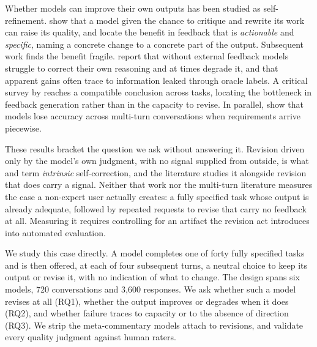 Whether models can improve their own outputs has been studied as self-refinement.
\citet{madaan2024self} show that a model given the chance to critique and rewrite its work
can raise its quality, and locate the benefit in feedback that is \emph{actionable} and
\emph{specific}, naming a concrete change to a concrete part of the output. Subsequent work
finds the benefit fragile. \citet{huang2024large} report that without external feedback
models struggle to correct their own reasoning and at times degrade it, and that apparent
gains often trace to information leaked through oracle labels. A critical survey by
\citet{kamoi2024selfcorrection} reaches a compatible conclusion across tasks, locating the
bottleneck in feedback generation rather than in the capacity to revise. In parallel,
\citet{laban2025lost} show that models lose accuracy across multi-turn conversations when
requirements arrive piecewise.

These results bracket the question we ask without answering it. Revision driven only by the
model's own judgment, with no signal supplied from outside, is what
\citet{kamoi2024selfcorrection} and \citet{huang2024large} term \emph{intrinsic}
self-correction, and the literature studies it alongside revision that does carry a signal.
Neither that work nor the multi-turn literature measures the case a non-expert user
actually creates: a fully specified task whose output is already adequate, followed by
repeated requests to revise that carry no feedback at all. Measuring it requires
controlling for an artifact the revision act introduces into automated evaluation.

We study this case directly. A model completes one of forty fully specified tasks and is
then offered, at each of four subsequent turns, a neutral choice to keep its output or
revise it, with no indication of what to change. The design spans six models, 720
conversations and 3,600 responses. We ask whether such a model revises at all (RQ1),
whether the output improves or degrades when it does (RQ2), and whether failure traces to
capacity or to the absence of direction (RQ3).
We strip the meta-commentary models attach to revisions, and validate every quality
judgment against human raters.

